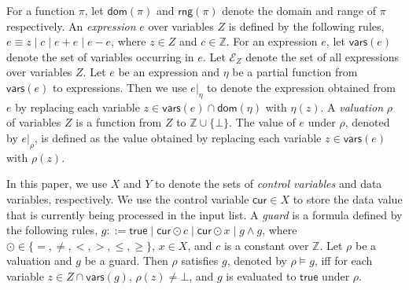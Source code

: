\documentclass[runningheads,a4paper]{llncs}
\def\Ee{{\mathcal{E} }}
\newcommand\intnum{{\mathbb{Z} }}
\newcommand\cur{\mathsf{cur}}
\newcommand\vars{\mathsf{vars}}
\newcommand\dom{\mathsf{dom}}
\newcommand\rng{\mathsf{rng}}
\newcommand\ltrue{\mathsf{true}}
\newcommand{\sub}[2]{#1|_{#2}}
\begin{document}
For a function $\pi$, let $\dom(\pi)$ and $\rng(\pi)$ denote the domain  and range of $\pi$ respectively. 
An \emph{expression} $e$ over variables $Z$ is defined by the following rules, $e\equiv  z \mid c \mid e + e \mid e - e$, where $z \in Z$ and $c\in \intnum$. 
For an expression $e$, let $\vars(e)$ denote the set of variables occurring in $e$. Let $\Ee_Z$ denote the set of all expressions over variables $Z$. Let $e$ be an expression and $\eta$ be a partial function from $\vars(e)$ to expressions. Then we use $\sub{e}{\eta}$ to denote the expression obtained from $e$ by replacing each variable $z \in \vars(e)\cap\dom(\eta)$ with $\eta(z)$. A \emph{valuation} $\rho$ of variables $Z$ is a function from $Z$ to $\intnum \cup \{\bot\}$. The value of $e$ under $\rho$, denoted by $\sub{e}{\rho}$, is defined as the value obtained by replacing each variable $z \in \vars(e)$ with $\rho(z)$.

In this paper, we use $X$ and $Y$ to denote the sets of \emph{control variables} and {data variables}, respectively. We use the control variable $\cur \in X$ to store the data value that is currently being processed in the input list.
A \emph{guard} is a formula defined by the following rules, $g::= \ltrue \mid \cur\odot c \mid \cur\odot x \mid g \wedge g$, where $\odot \in \{=,\neq,<, >, \le, \ge\}$, $x \in X$, and $c$ is a constant over $\intnum$. 
Let $\rho$ be a valuation and $g$ be a guard. Then $\rho$ satisfies $g$, denoted by $\rho \models g$, iff for each variable $z \in Z \cap \vars(g)$, $\rho(z) \neq \bot$, and $g$ is evaluated to $\ltrue$ under $\rho$. 
\end{document}
